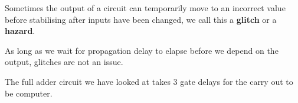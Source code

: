 
\begin{definition}
    Sometimes the output of a circuit can temporarily move to an incorrect value before stabilising after inputs have been changed, we call this a \textbf{glitch} or a \textbf{hazard}.
    
    As long as we wait for propagation delay to elapse before we depend on the output, glitches are not an issue.
\end{definition}



\begin{example}
    The full adder circuit we have looked at takes 3 gate delays for the carry out to be computer.
\end{example}

